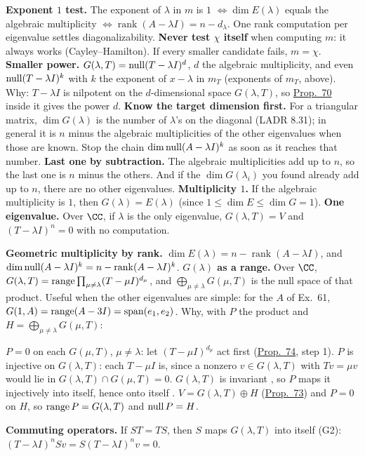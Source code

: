 \documentclass[10pt]{scrartcl}
\begin{document}
\begin{shortcuts}
  \ii \textbf{Exponent $1$ test.} The exponent of $\lambda$ in $m$ is $1$ $\iff\dim E(\lambda)$ equals the algebraic multiplicity $\iff\operatorname{rank}(A-\lambda I)=n-d_\lambda$. One rank computation per eigenvalue settles diagonalizability.
  \ii \textbf{Never test $\chi$ itself} when computing $m$: it always works (Cayley--Hamilton). If every smaller candidate fails, $m=\chi$.
  \ii \textbf{Smaller power.} $G(\lambda,T)=\operatorname{null}(T-\lambda I)^{d}$, $d$ the algebraic multiplicity, and even $\operatorname{null}(T-\lambda I)^{k}$ with $k$ the exponent of $x-\lambda$ in $m_T$ (exponents of $m_T$, above). Why: $T-\lambda I$ is nilpotent on the $d$-dimensional space $G(\lambda,T)$, so \hyperref[prop-70]{Prop.~70} inside it gives the power $d$.
  \ii \textbf{Know the target dimension first.} For a triangular matrix, $\dim G(\lambda)$ is the number of $\lambda$'s on the diagonal (LADR 8.31); in general it is $n$ minus the algebraic multiplicities of the other eigenvalues when those are known. Stop the chain $\dim\operatorname{null}(A-\lambda I)^k$ as soon as it reaches that number.
  \ii \textbf{Last one by subtraction.} The algebraic multiplicities add up to $n$, so the last one is $n$ minus the others. And if the $\dim G(\lambda_i)$ you found already add up to $n$, there are no other eigenvalues.
  \ii \textbf{Multiplicity $1$.} If the algebraic multiplicity is $1$, then $G(\lambda)=E(\lambda)$ (since $1\le\dim E\le\dim G=1$).
  \ii \textbf{One eigenvalue.} Over $\CC$, if $\lambda$ is the only eigenvalue, $G(\lambda,T)=V$ and $(T-\lambda I)^n=0$ with no computation.
\end{shortcuts}
\begin{shortcuts}
  \ii \textbf{Geometric multiplicity by rank.} $\dim E(\lambda)=n-\operatorname{rank}(A-\lambda I)$, and $\dim\operatorname{null}(A-\lambda I)^k=n-\operatorname{rank}(A-\lambda I)^k$.
  \ii \textbf{$G(\lambda)$ as a range.} Over $\CC$, $G(\lambda,T)=\operatorname{range}\prod_{\mu\ne\lambda}(T-\mu I)^{d_\mu}$, and $\bigoplus_{\mu\ne\lambda}G(\mu,T)$ is the null space of that product. Useful when the other eigenvalues are simple: for the $A$ of Ex.~61, $G(1,A)=\operatorname{range}(A-3I)=\operatorname{span}(e_1,e_2)$. Why, with $P$ the product and $H=\bigoplus_{\mu\ne\lambda}G(\mu,T)$:
  \begin{enumerate}[label=\arabic*.,itemsep=1pt]
    \ii $P=0$ on each $G(\mu,T)$, $\mu\ne\lambda$: let $(T-\mu I)^{d_\mu}$ act first (\hyperref[prop-74]{Prop.~74}, step 1).
    \ii $P$ is injective on $G(\lambda,T)$: each $T-\mu I$ is, since a nonzero $v\in G(\lambda,T)$ with $Tv=\mu v$ would lie in $G(\lambda,T)\cap G(\mu,T)=0$.
    \ii $G(\lambda,T)$ is invariant , so $P$ maps it injectively into itself, hence onto itself .
    \ii $V=G(\lambda,T)\oplus H$ (\hyperref[prop-73]{Prop.~73}) and $P=0$ on $H$, so $\operatorname{range} P=G(\lambda,T)$ and $\operatorname{null} P=H$.
  \end{enumerate}
  \ii \textbf{Commuting operators.} If $ST=TS$, then $S$ maps $G(\lambda,T)$ into itself (G2): $(T-\lambda I)^nSv=S(T-\lambda I)^nv=0$.
\end{shortcuts}
\end{document}
